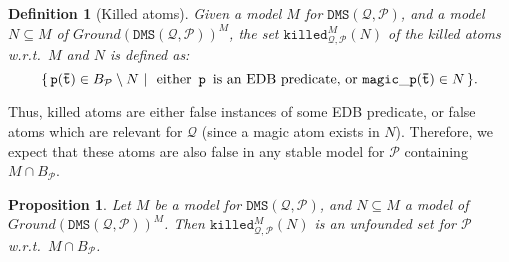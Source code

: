 \documentclass{tlp}
\newcommand{\p}{\ensuremath{{\mathcal{P}}}}
\newcommand{\BP}{\ensuremath{B_{\p}}}
\newcommand{\ground}[1]{\ensuremath{Ground(#1)}}
\newtheorem{definition}[theorem]{Definition}
\newtheorem{proposition}[theorem]{Proposition}
\newcommand{\Q}{\mathcal{Q}}
\newcommand{\dmsqp}{\ensuremath{\DMS(\Q,\p)}}
\newcommand{\killed}[4]{\ensuremath{\mathtt{killed}^{#1}_{#3,#4}(#2)}}
\newcommand{\killedmn}{\ensuremath{\killed{M}{N}{\Q}{\p}}}
\newcommand{\DMS}{\ensuremath{\mathtt{DMS}}}
\renewcommand{\t}{\bar t}
\begin{document}
\begin{definition}[Killed atoms]
\label{def:killed} Given a model $M$ for $\dmsqp$, and a model $N \subseteq M$ of $\ground{\dmsqp}^{M}$, 
the set $\killedmn$ of the \emph{killed atoms}
w.r.t.\ $M$ and $N$ is defined as: 
$$
\{\,{\tt p(\t)} \in \BP \setminus N \ | \ \mbox{ either }\, {\tt p}\, 
    \mbox{ is an EDB predicate, or } {\tt magic\_p(\t)} \in N\,\}.
$$
\end{definition}

Thus, killed atoms are either 
false instances of some EDB predicate, or false atoms which are relevant 
for $\Q$ (since a magic atom exists in $N$).
Therefore, we expect that these atoms are also false in any stable model for $\p$ 
containing $M \cap \BP$. 


\begin{proposition}
\label{prop:killed_unfounded} Let $M$ be a model for $\dmsqp$, 
and $N \subseteq M$ a model of $\ground{\dmsqp}^{M}$. Then $\killedmn$ is an unfounded set
for $\p$ w.r.t.\ $M \cap \BP$.
\end{proposition}
\end{document}
